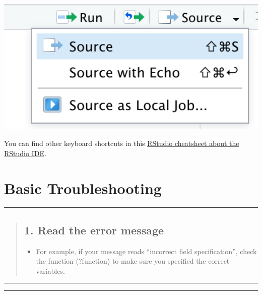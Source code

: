 \documentclass[
]{book}
\providecommand{\tightlist}{%
  \setlength{\itemsep}{0pt}\setlength{\parskip}{0pt}}
\begin{document}
\begin{center}\includegraphics[width=6.28in]{img/Running} \end{center}

You can find other keyboard shortcuts in this \href{https://github.com/rstudio/cheatsheets/raw/master/rstudio-ide.pdf}{RStudio cheatsheet about the RStudio IDE}.

\hypertarget{basic-troubleshooting}{%
\section{Basic Troubleshooting}\label{basic-troubleshooting}}

\begin{center}\rule{0.5\linewidth}{0.5pt}\end{center}

\begin{quote}
\hypertarget{read-the-error-message}{%
\subsection*{1. Read the error message}\label{read-the-error-message}}

\begin{itemize}
\tightlist
\item
  For example, if your message reads ``incorrect field specification'', check the function (?function) to make sure you specified the correct variables.
\end{itemize}
\end{quote}

\begin{center}\rule{0.5\linewidth}{0.5pt}\end{center}

\begin{center}\rule{0.5\linewidth}{0.5pt}\end{center}
\end{document}
